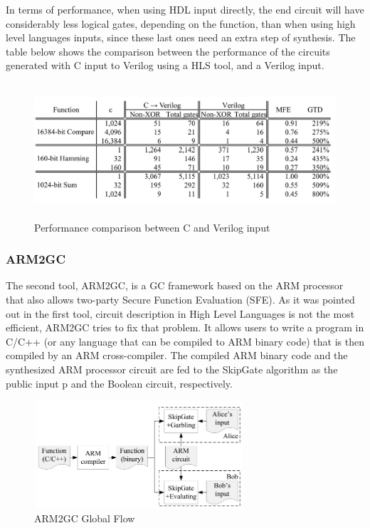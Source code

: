 \begin{refsection}
In terms of performance, when using HDL input directly, the end circuit will have considerably less logical gates, depending on the function, than when using high level languages inputs, since these last ones need an extra step of synthesis. The table below shows the comparison between the performance of the circuits generated with
C input to Verilog using a HLS tool, and a Verilog input.

\begin{figure}[H]
	\centering
	\includegraphics[width=1\textwidth, height=5cm]{./sdf/secure_multiparty_computation/figures/tiny_garble_CvsHDL.png}
    \caption{Performance comparison between C and Verilog input\cite{TinyGarble}}\label{fig:tinygarble_comparison}
\end{figure}

\subsubsection{ARM2GC}

The second tool, ARM2GC, is a GC framework based on the ARM processor that also allows two-party Secure Function Evaluation (SFE).
As it was pointed out in the first tool, circuit description in High Level Languages is not the most efficient,  ARM2GC tries to fix that problem.
It allows users to write a program in C/C++ (or any language that can be compiled to ARM binary code) that is then compiled by an ARM cross-compiler. The compiled ARM binary code and the synthesized ARM processor circuit are fed to the SkipGate algorithm as the public input p and the Boolean circuit, respectively\cite{ARM2GC}.

\begin{figure}[H]
	\centering
	\includegraphics[width=0.7\textwidth, height=4cm]{./sdf/secure_multiparty_computation/figures/arm2gc_global_flow.png}
    \caption{ARM2GC Global Flow\cite{ARM2GC}}\label{fig:arm2gc_flow}
\end{figure}

\clearpage
\printbibliography[heading=subbibliography]
\end{refsection}
\cleardoublepage
